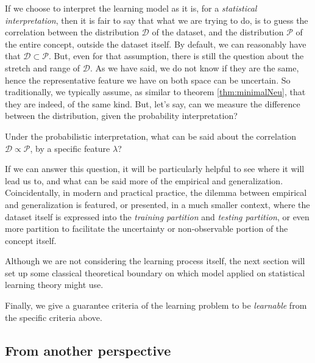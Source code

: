 If we choose to interpret the learning model as it is, for a \textit{statistical interpretation}, then it is fair to say that what we are trying to do, is to guess the correlation between the distribution $\mathcal{D}$ of the dataset, and the distribution $\mathcal{P}$ of the entire concept, outside the dataset itself. By default, we can reasonably have that $\mathcal{D}\subset \mathcal{P}$. But, even for that assumption, there is still the question about the stretch and range of $\mathcal{D}$. As we have said, we do not know if they are the same, hence the representative feature we have on both space can be uncertain. So traditionally, we typically assume, as similar to theorem \ref{thm:minimalNeu}, that they are indeed, of the same kind. But, let's say, can we measure the difference between the distribution, given the probability interpretation? 

\begin{question}
    Under the probabilistic interpretation, what can be said about the correlation $\mathcal{D}\propto \mathcal{P}$, by a specific feature $\lambda$?
\end{question}

If we can answer this question, it will be particularly helpful to see where it will lead us to, and what can be said more of the empirical and generalization. Coincidentally, in modern and practical practice, the dilemma between empirical and generalization is featured, or presented, in a much smaller context, where the dataset itself is expressed into the \textit{training partition} and \textit{testing partition}, or even more partition to facilitate the uncertainty or non-observable portion of the concept itself. 

Although we are not considering the learning process itself, the next section will set up some classical theoretical boundary on which model applied on statistical learning theory might use. 

Finally, we give a guarantee criteria of the learning problem to be \textit{learnable} from the specific criteria above. 

\subsection{From another perspective}

